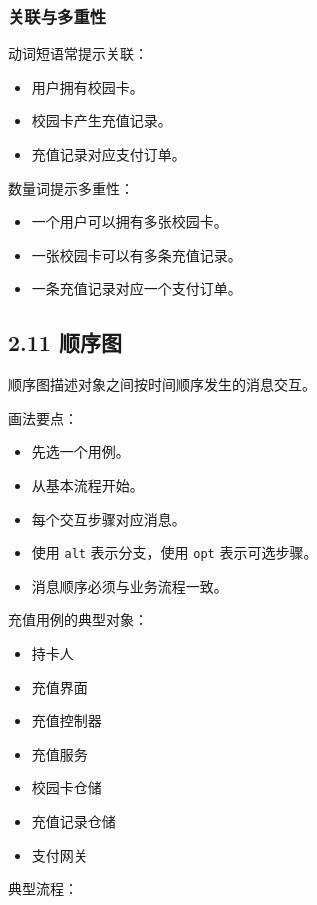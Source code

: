 \documentclass[UTF8,zihao=-4]{ctexart}
\begin{document}
\subsubsection{关联与多重性}

动词短语常提示关联：

\begin{itemize}
\item 用户拥有校园卡。
\item 校园卡产生充值记录。
\item 充值记录对应支付订单。
\end{itemize}

数量词提示多重性：

\begin{itemize}
\item 一个用户可以拥有多张校园卡。
\item 一张校园卡可以有多条充值记录。
\item 一条充值记录对应一个支付订单。
\end{itemize}

\subsection{2.11 顺序图}

顺序图描述对象之间按时间顺序发生的消息交互。

画法要点：

\begin{itemize}
\item 先选一个用例。
\item 从基本流程开始。
\item 每个交互步骤对应消息。
\item 使用 \texttt{alt} 表示分支，使用 \texttt{opt} 表示可选步骤。
\item 消息顺序必须与业务流程一致。
\end{itemize}

充值用例的典型对象：

\begin{itemize}
\item 持卡人
\item 充值界面
\item 充值控制器
\item 充值服务
\item 校园卡仓储
\item 充值记录仓储
\item 支付网关
\end{itemize}

典型流程：
\end{document}
